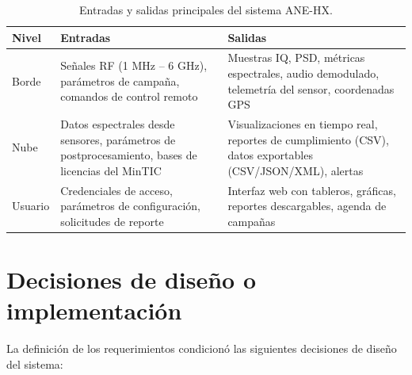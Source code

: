 \begin{table}[H]
\centering
\caption{Entradas y salidas principales del sistema ANE-HX.}
\label{tab:req_io}
\begin{tabularx}{\textwidth}{@{}l X X@{}}
\toprule
Nivel & Entradas & Salidas \\
\midrule
Borde & Señales RF (1 MHz -- 6 GHz), parámetros de campaña, comandos de control remoto & Muestras IQ, PSD, métricas espectrales, audio demodulado, telemetría del sensor, coordenadas GPS \\
Nube & Datos espectrales desde sensores, parámetros de postprocesamiento, bases de licencias del MinTIC & Visualizaciones en tiempo real, reportes de cumplimiento (CSV), datos exportables (CSV/JSON/XML), alertas \\
Usuario & Credenciales de acceso, parámetros de configuración, solicitudes de reporte & Interfaz web con tableros, gráficas, reportes descargables, agenda de campañas \\
\bottomrule
\end{tabularx}
\end{table}

\section{Decisiones de diseño o implementación}

La definición de los requerimientos condicionó las siguientes decisiones de diseño del sistema:

